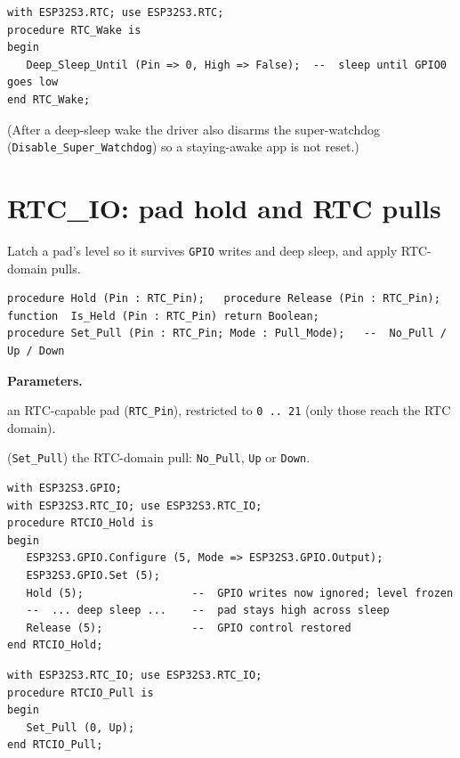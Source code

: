 \begin{lstlisting}
with ESP32S3.RTC; use ESP32S3.RTC;
procedure RTC_Wake is
begin
   Deep_Sleep_Until (Pin => 0, High => False);  --  sleep until GPIO0 goes low
end RTC_Wake;
\end{lstlisting}
(After a deep-sleep wake the driver also disarms the super-watchdog
(\texttt{Disable\_Super\_Watchdog}) so a staying-awake app is not reset.)

\section{RTC\_IO: pad hold and RTC pulls}

Latch a pad's level so it survives \texttt{GPIO} writes and deep sleep, and apply
RTC-domain pulls.

\begin{lstlisting}
procedure Hold (Pin : RTC_Pin);   procedure Release (Pin : RTC_Pin);
function  Is_Held (Pin : RTC_Pin) return Boolean;
procedure Set_Pull (Pin : RTC_Pin; Mode : Pull_Mode);   --  No_Pull / Up / Down
\end{lstlisting}

\textbf{Parameters.}
\begin{description}[style=nextline]
\item[\texttt{Pin}] an RTC-capable pad (\texttt{RTC\_Pin}), restricted to
  \texttt{0\,..\,21} (only those reach the RTC domain).
\item[\texttt{Mode}] (\texttt{Set\_Pull}) the RTC-domain pull: \texttt{No\_Pull},
  \texttt{Up} or \texttt{Down}.
\end{description}

\begin{lstlisting}
with ESP32S3.GPIO;
with ESP32S3.RTC_IO; use ESP32S3.RTC_IO;
procedure RTCIO_Hold is
begin
   ESP32S3.GPIO.Configure (5, Mode => ESP32S3.GPIO.Output);
   ESP32S3.GPIO.Set (5);
   Hold (5);                 --  GPIO writes now ignored; level frozen
   --  ... deep sleep ...    --  pad stays high across sleep
   Release (5);              --  GPIO control restored
end RTCIO_Hold;
\end{lstlisting}

\begin{lstlisting}
with ESP32S3.RTC_IO; use ESP32S3.RTC_IO;
procedure RTCIO_Pull is
begin
   Set_Pull (0, Up);
end RTCIO_Pull;
\end{lstlisting}

